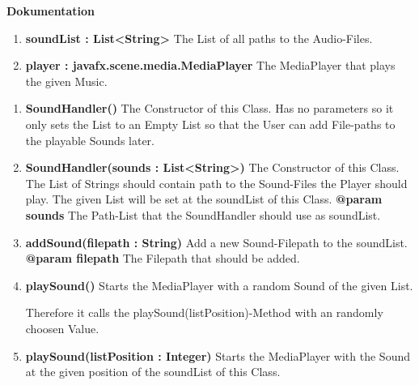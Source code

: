			\textbf{Dokumentation}\newline
			\begin{enumerate}[-]
				\item{
					\textbf{soundList : List<String>} \newline
					The List of all paths to the Audio-Files.
				}
				\item{
					\textbf{player : javafx.scene.media.MediaPlayer} \newline
					The MediaPlayer that plays the given Music.
				}
			\end{enumerate}
			\begin{enumerate}[+]
				\item{
					\textbf{SoundHandler()} \newline
					The Constructor of this Class.
					Has no parameters so it only sets the List to an Empty List so that the User can add File-paths to the playable Sounds later.
					\newline
				}
				\item{
					\textbf{SoundHandler(sounds : List<String>)} \newline
					The Constructor of this Class.
					The List of Strings should contain path to the Sound-Files the Player should play.
					The given List will be set at the soundList of this Class.
					\newline
					\textbf{@param sounds}
						The Path-List that the SoundHandler should use as soundList.
						\newline
				}
				\item{
					\textbf{addSound(filepath : String)} \newline
					Add a new Sound-Filepath to the soundList.
					\newline
					\textbf{@param filepath}
						The Filepath that should be added.
						\newline
				}
				\item{
					\textbf{playSound()} \newline
					Starts the MediaPlayer with a random Sound of the given List.
					
					Therefore it calls the playSound(listPosition)-Method with an randomly choosen Value.
					\newline
				}
				\item{
					\textbf{playSound(listPosition : Integer)} \newline
					Starts the MediaPlayer with the Sound at the given position of the soundList of this Class.
					
}
\end{enumerate}
